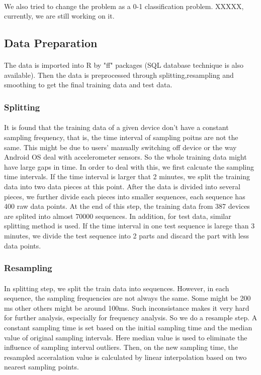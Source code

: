 \documentclass{article}
\begin{document}
	\paragraph{} We also tried to change the problem as a 0-1 classification problem. XXXXX, currently, we are still working on it. 
	
		\subsection{Data Preparation} %
		\label{sub:idea}
		\paragraph{} The data is imported into R by "ff" packages (SQL database technique is also available). Then the data is preprocessed through splitting,resampling and smoothing to get the final training data and test data. 
		 \subsubsection{Splitting}
		\paragraph{}It is found that the training data of a given device don't have a constant sampling frequency, that is, the time interval of sampling poitns are not the same. This might be due to users' manually switching off device or the way Android OS deal with accelerometer sensors. So the whole training data might have large gaps in time. In order to deal with this, we first calcuate the sampling time intervals. If the time interval is larger that 2 minutes, we split the training data into two data pieces at this point. After the data is divided into several pieces, we further divide each pieces into smaller sequences, each sequence has 400 raw data points. At the end of this step, the training data from 387 devices are splited into almost 70000 sequences. 
		In addition, for test data, similar splitting method is used. If the time interval in one test sequence is larege than 3 minutes, we divide the test sequence into 2 parts and discard the part with less data points.
		\subsubsection{Resampling}
		\paragraph{} In splitting step, we split the train data into sequences. However, in each sequence, the sampling frequencies are not always the same. Some might be 200 ms other others might be around 100ms.  Such inconsistance makes it very hard for further analysis, especially for frequency analysis. So we do a resample step. A constant sampling time is set based on the initial sampling time and the median value of original sampling intervals. Here median value is used to eliminate the influence of sampling interval outliers. Then, on the new sampling time, the resampled acceralation value is calculated by linear interpolation based on two nearest sampling points. 
\end{document}
